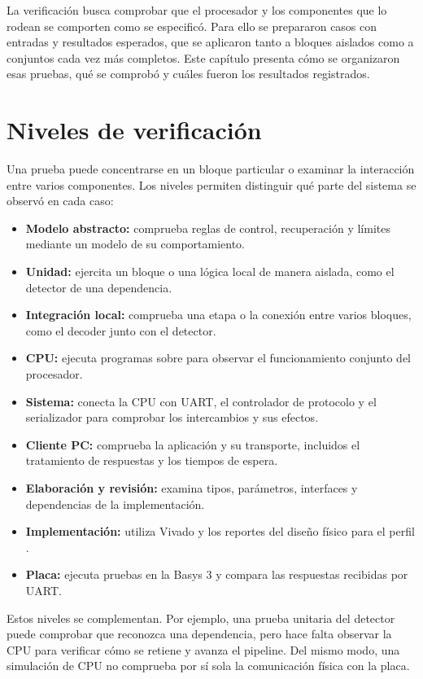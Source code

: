 La verificación busca comprobar que el procesador y los componentes que lo
rodean se comporten como se especificó. Para ello se prepararon casos con
entradas y resultados esperados, que se aplicaron tanto a bloques aislados como
a conjuntos cada vez más completos. Este capítulo presenta cómo se organizaron
esas pruebas, qué se comprobó y cuáles fueron los resultados registrados.

\section{Niveles de verificación}

Una prueba puede concentrarse en un bloque particular o examinar la interacción
entre varios componentes. Los niveles permiten distinguir qué parte del
sistema se observó en cada caso:

\begin{itemize}
  \item \textbf{Modelo abstracto:} comprueba reglas de control, recuperación y
    límites mediante un modelo de su comportamiento.
  \item \textbf{Unidad:} ejercita un bloque o una lógica local de manera
    aislada, como el detector de una dependencia.
  \item \textbf{Integración local:} comprueba una etapa o la conexión entre
    varios bloques, como el decoder junto con el detector.
  \item \textbf{CPU:} ejecuta programas sobre  para
    observar el funcionamiento conjunto del procesador.
  \item \textbf{Sistema:} conecta la CPU con UART, el controlador de protocolo
    y el serializador para comprobar los intercambios y sus efectos.
  \item \textbf{Cliente PC:} comprueba la aplicación y su transporte, incluidos
    el tratamiento de respuestas y los tiempos de espera.
  \item \textbf{Elaboración y revisión:} examina tipos, parámetros, interfaces
    y dependencias de la implementación.
  \item \textbf{Implementación:} utiliza Vivado y los reportes del diseño
    físico para el perfil .
  \item \textbf{Placa:} ejecuta pruebas en la Basys 3 y compara las respuestas
    recibidas por UART.
\end{itemize}

Estos niveles se complementan. Por ejemplo, una prueba unitaria del detector
puede comprobar que reconozca una dependencia, pero hace falta observar la CPU
para verificar cómo se retiene y avanza el pipeline. Del mismo modo, una
simulación de CPU no comprueba por sí sola la comunicación física con la placa.

